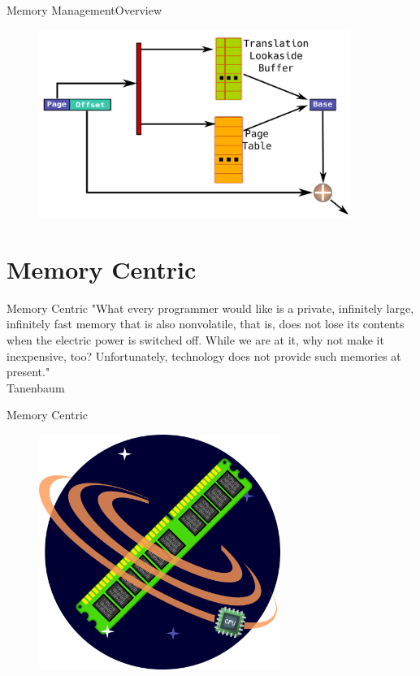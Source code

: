 \documentclass[10pt]{beamer}
\begin{document}
\begin{frame}{Memory Management}{Overview}
  \begin{figure}[ht]
    \centering
    \includegraphics[width=0.9\textwidth, keepaspectratio=true]{images/tlb_d.png}
  \end{figure}
\end{frame}

\section{Memory Centric}
\begin{frame}{Memory Centric}{}
"What every programmer would like is a private, infinitely large, infinitely
fast memory that is also nonvolatile, that is, does not lose its contents when
the electric power is switched off. While we are at it, why not make it
inexpensive, too? Unfortunately, technology does not provide such memories at
present."\\
Tanenbaum
\end{frame}

\begin{frame}{Memory Centric}{}
  \begin{figure}[ht]
    \centering
    \includegraphics[width=0.7\textwidth, keepaspectratio=true]{images/memory_centric.png}
  \end{figure}
\end{frame}
\end{document}

